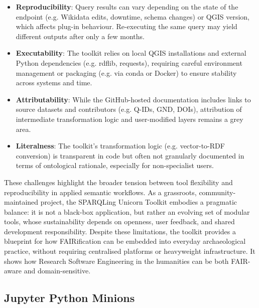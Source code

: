 \documentclass{eceasst}
\begin{document}
\begin{itemize}
    \item \textbf{Reproducibility}: Query results can vary depending on the state of the endpoint (e.g. Wikidata edits, downtime, schema changes) or QGIS version, which affects plug-in behaviour. Re-executing the same query may yield different outputs after only a few months.
    \item \textbf{Executability}: The toolkit relies on local QGIS installations and external Python dependencies (e.g. rdflib, requests), requiring careful environment management or packaging (e.g. via conda or Docker) to ensure stability across systems and time.
    \item \textbf{Attributability}: While the GitHub-hosted documentation includes links to source datasets and contributors (e.g. Q-IDs, GND, DOIs), attribution of intermediate transformation logic and user-modified layers remains a grey area.
    \item \textbf{Literalness}: The toolkit’s transformation logic (e.g. vector-to-RDF conversion) is transparent in code but often not granularly documented in terms of ontological rationale, especially for non-specialist users.
\end{itemize}

These challenges highlight the broader tension between tool flexibility and reproducibility in applied semantic workflows. As a grassroots, community-maintained project, the SPARQLing Unicorn Toolkit embodies a pragmatic balance: it is not a black-box application, but rather an evolving set of modular tools, whose sustainability depends on openness, user feedback, and shared development responsibility. Despite these limitations, the toolkit provides a blueprint for how FAIRification can be embedded into everyday archaeological practice, without requiring centralised platforms or heavyweight infrastructure. It shows how Research Software Engineering in the humanities can be both FAIR-aware and domain-sensitive.

\subsection{Jupyter Python Minions}\label{sec:33}
\end{document}
